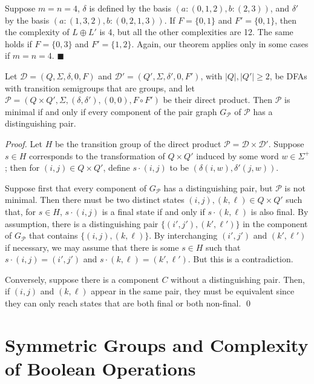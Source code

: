\documentclass{llncs}
\newcommand{\Sig}{\Sigma}
\newcommand{\cD}{{\mathcal D}}
\newcommand{\cP}{{\mathcal P}}
\newcommand{\qedb}{\hfill$\blacksquare$}
\begin{document}
\begin{example}
\label{ex:44}
Suppose $m=n=4$,  $\delta$ is defined by the basis $(a\colon (0,1,2), b\colon (2,3))$, and  $\delta'$ by  the basis
$(a\colon(1,3,2), b\colon (0,2,1,3))$. If $F=\{0,1\}$ and
$F'=\{0,1\}$,
then the complexity of $L\oplus L'$ is 4, but all the other complexities are 12.
The same holds if $F=\{0,3\}$ and $F'=\{1,2\}$.
Again, our theorem applies only in some cases if $m=n=4$.
\qedb
\end{example}





\begin{lemma}
\label{lem:dist}
Let $\cD=(Q,\Sig,\delta,0,F)$ and $\cD'=(Q',\Sig,\delta',0,F')$, with $|Q|,|Q'| \ge 2$, be 
DFAs with transition semigroups  that are groups, and let $\cP=(Q\times Q', \Sig, (\delta,\delta'), (0,0), F\circ F')$ be their direct product.
Then $\cP$ is minimal if and only if every component of the pair graph $G_\cP$ of $\cP$ has a distinguishing pair.
\end{lemma}
\begin{proof}  Let $H$ be the transition group of the direct product $\cP=\cD\times\cD'$.  
Suppose $s\in H$ corresponds to the transformation of $Q\times Q'$ induced by some word $w\in \Sig^+$; 
then for $(i,j)\in Q\times Q'$, define $s\cdot (i,j)$ to be $(\delta(i,w),\delta'(j,w))$.

Suppose first that every component of $G_\cP$ has a distinguishing pair, but $\cP$ is not minimal.   Then there must be two distinct states $(i,j),(k,\ell)\in Q\times Q'$ such that, for $s\in H$, $s\cdot (i,j)$ is a final state if and only if $s\cdot (k,\ell)$ is also final.
By assumption, there is a distinguishing pair $\{(i',j'),(k',\ell')\}$ in the component of $G_\cP$ that contains $\{(i,j),(k,\ell)\}$.  By interchanging $(i',j')$ and $(k',\ell')$ if necessary, we may assume that there is some $s\in H$ such that 
$s\cdot (i,j) = (i',j')$ and $s\cdot (k,\ell)=(k',\ell')$.  But this is a contradiction.

Conversely, suppose there is a component $C$ without a distinguishing pair. Then, if 
$(i,j)$ and $(k,\ell)$ appear in the same pair, they must be equivalent since they can only reach states that are both final or both non-final. 
\qed
\end{proof}



\section{Symmetric Groups and Complexity of Boolean Operations}
\label{sec:main}
\end{document}
